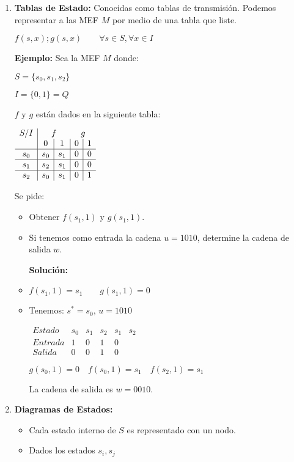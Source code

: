 \begin{enumerate}
\item \textbf{Tablas de Estado: }Conocidas como tablas de transmisión. Podemos representar a las MEF $M$ por medio de una tabla que liste.

$f(s,x);g(s,x)\qquad \forall s\in S, \forall x\in I$

\textbf{Ejemplo: }Sea la MEF $M$ donde:

$S=\{ s_0,s_1,s_2\}$

$I=\{0,1\}=Q$

$f$ y $g$ están dados en la siguiente tabla:

\begin{center}
$\begin{array}{c|c|c|c|c}
S/I		&\multicolumn{2}{c}{f}	&\multicolumn{2}{c}{g}\\ 
		&0		&1		&0	&1	\\ \hline
s_0	&s_0	&s_1	&0	&0	\\ \hline
s_1	&s_2	&s_1	&0	&0	\\ \hline
s_2	&s_0	&s_1	&0	&1
\end{array}$
\end{center}

Se pide:
	\begin{itemize}
	\item Obtener $f(s_1,1)$ y $g(s_1,1)$.
	\item Si tenemos como entrada la cadena $u=1010$, determine la cadena de salida $w$.
	
	\textbf{Solución: }
	\item $f(s_1,1)=s_1\qquad g(s_1,1)=0$
	\item Tenemos: $s^*=s_0$, $u=1010$
	\begin{center}
	$\begin{array}{c|c|c|c|c|c}
	Estado	&s_0	&s_1	&s_2	&s_1	&s_2	\\ \hline
	Entrada	&1	&0	&1	&0	&	\\ \hline
	Salida	&0	&0	&1	&0	&	
	\end{array}$\\	
	\end{center}
	$g(s_0,1)=0 \quad f(s_0,1)=s_1 \quad f(s_2,1)=s_1$ %
	
	La cadena de salida es $w=0010$.
	\end{itemize}
\item \textbf{Diagramas de Estados: }
	\begin{itemize}
	\item Cada estado interno de $S$ es representado con un nodo.
	\item Dados los estados $s_i,s_j$
	

\end{itemize}
\end{enumerate}
